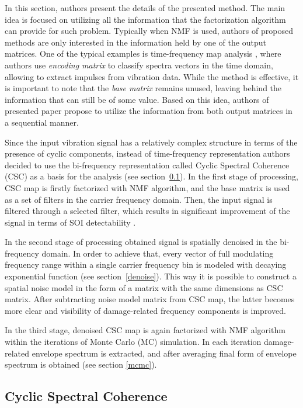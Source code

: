 \documentclass[3p, 12pt]{elsarticle} %
\begin{document}
In this section, authors present the details of the presented method. The main idea is focused on utilizing all the information that the factorization algorithm can provide for such problem. Typically when NMF is used, authors of proposed methods are only interested in the information held by one of the output matrices. One of the typical examples is time-frequency map analysis \cite{wodecki2017local}, where authors use \emph{encoding matrix} to classify spectra vectors in the time domain, allowing to extract impulses from vibration data. While the method is effective, it is important to note that the \emph{base matrix} remains unused, leaving behind the information that can still be of some value. Based on this idea, authors of presented paper propose to utilize the information from both output matrices in a sequential manner. 

Since the input vibration signal has a relatively complex structure in terms of the presence of cyclic components, instead of time-frequency representation authors decided to use the bi-frequency representation called Cyclic Spectral Coherence (CSC) as a basis for the analysis (see section~\ref{cscs}). In the first stage of processing, CSC map is firstly factorized with NMF algorithm, and the base matrix is used as a set of filters in the carrier frequency domain. Then, the input signal is filtered through a selected filter, which results in significant improvement of the signal in terms of SOI detectability \cite{wodecki2017novel}. 

In the second stage of processing obtained signal is spatially denoised in the bi-frequency domain. In order to achieve that, every vector of full modulating frequency range within a single carrier frequency bin is modeled with decaying exponential function (see section~\ref{denoise}). This way it is possible to construct a spatial noise model in the form of a matrix with the same dimensions as CSC matrix. After subtracting noise model matrix from CSC map, the latter becomes more clear and visibility of damage-related frequency components is improved.

In the third stage, denoised CSC map is again factorized with NMF algorithm within the iterations of Monte Carlo (MC) simulation. In each iteration damage-related envelope spectrum is extracted, and after averaging final form of envelope spectrum is obtained (see section \ref{mcmc}).

\subsection{Cyclic Spectral Coherence}\label{cscs}
\end{document}
